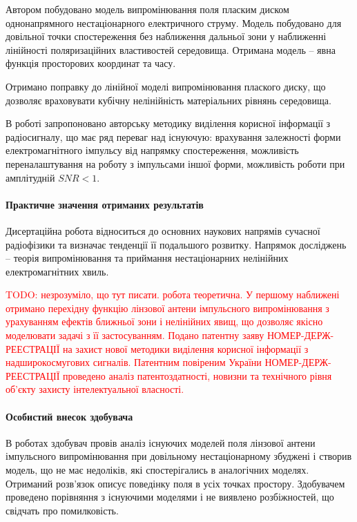 Автором побудовано модель випромінювання поля пласким диском однонапрямного 
нестаціонарного електричного струму. Модель побудовано для довільної точки 
спостереження без наближення дальньої зони у наближенні лінійності 
поляризаційних властивостей середовища. Отримана модель -- явна функція 
просторових координат та часу.

Отримано поправку до лінійної моделі випромінювання плаского диску, що 
дозволяє враховувати кубічну нелінійність матеріальних рівнянь середовища.

В роботі запропоновано авторську методику виділення корисної інформації з 
радіосигналу, що має ряд переваг над існуючую: врахування залежності форми 
електромагнітного імпульсу від напрямку спостереження, можливість 
переналаштування на роботу з імпульсами іншої форми, можливість роботи при 
амплітудній $ SNR < 1 $.

\paragraph{Практичне значення отриманих результатів}

Дисертаційна робота відноситься до основних наукових напрямів сучасної 
радіофізики та визначає тенденції її подальшого розвитку. Напрямок
досліджень -- теорія випромінювання та приймання нестаціонарних 
нелінійних електромагнітних хвиль.

\textcolor{red}{TODO: незрозуміло, що тут писати. робота теоретична.
У першому наближені отримано перехідну функцію лінзової антени імпульсного 
випромінювання з урахуванням ефектів ближньої зони і нелінійних 
явищ, що дозволяє якісно моделювати задачі з її застосуванням.
Подано патентну заяву НОМЕР-ДЕРЖ-РЕЕСТРАЦІЇ на захист нової 
методики виділення корисної інформації з надширокосмугових сигналів. 
Патентним повіреним України НОМЕР-ДЕРЖ-РЕЕСТРАЦІЇ проведено аналіз 
патентоздатності, новизни та технічного рівня об'єкту захисту 
інтелектуальної власності.}

\paragraph{Особистий внесок здобувача}

В роботах \cite{my:Telecom2018, my:UKRCON2017, my:UKRCON2019} здобувач провів
аналіз існуючих моделей поля лінзової антени імпульсного випромінювання 
при довільному нестаціонарному збуджені і створив модель, що не має недоліків,
які спостерігались в аналогічних моделях. Отриманий розв'язок описує 
поведінку поля в усіх точках простору. Здобувачем проведено порівняння з 
існуючими моделями і не виявлено розбіжностей, що свідчать про помилковість.

